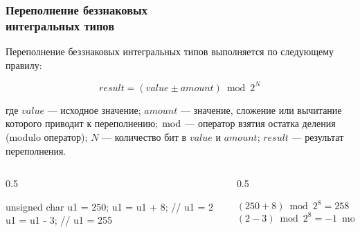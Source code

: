 \documentclass[compress, 8pt, aspectratio=169]{beamer}
\begin{document}
\begin{frame}[fragile]

    \frametitle{Переполнение беззнаковых \\ интегральных типов}

    Переполнение беззнаковых интегральных типов выполняется по
    следующему правилу:

    \begin{displaymath}
        result = (value \pm amount) \bmod 2^N
    \end{displaymath}

    где
    $value$ --- исходное значение;
    $amount$ --- значение, сложение или вычитание которого приводит
        к переполнению;
    $\bmod$ --- оператор взятия остатка деления (modulo оператор);
    $N$ --- количество бит в $value$ и $amount$;
    $result$ --- результат переполнения.

    \begin{columns}[T]

        \begin{column}{0.5\textwidth}

            \begin{myinplacelisting}[minted language=cpp]
unsigned char u1 = 250;
u1 = u1 + 8; // u1 = 2
u1 = u1 - 3;  // u1 = 255
            \end{myinplacelisting}

        \end{column}

        \begin{column}{0.5\textwidth}

            \begin{displaymath}
                (250 + 8) \bmod 2^8 = 258 \bmod 256 = 2
            \end{displaymath}
            \begin{displaymath}
                (2 - 3) \bmod 2^8 = -1 \bmod 256 = 255
            \end{displaymath}

        \end{column}

    \end{columns}

\end{frame}
\end{document}
